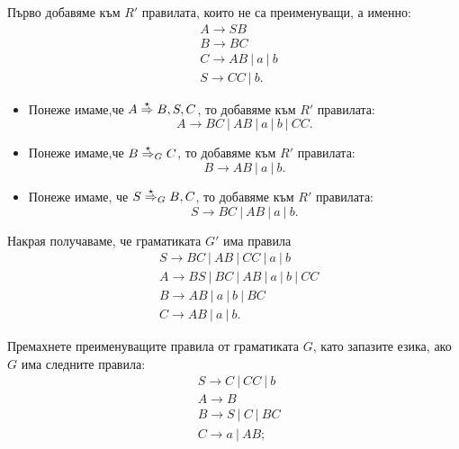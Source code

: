 \begin{extra}
\begin{multicols}{2}
\begin{example}
      Първо добавяме към $R'$ правилата, които не са преименуващи, а именно:
      \begin{align*}
        & A \to SB\\
        & B \to BC\\
        & C \to AB\ |\ a\ |\ b\\
        & S \to CC\ |\ b.
      \end{align*}
      \begin{itemize}
      \item 
        Понеже имаме,че $A \stackrel{{\star}}{\Rightarrow} B,S,C$, то добавяме към $R'$ правилата:
        \[A \to BC\ |\ AB\ |\ a\ |\ b\ |\ CC.\]
      \item
        Понеже имаме,че $B \stackrel{{\star}}{\Rightarrow}_G C$, то добавяме към $R'$ правилата:
        \[B \to AB\ |\ a\ |\ b.\]
      \item
        Понеже имаме, че $S \stackrel{{\star}}{\Rightarrow}_G B,C$, то добавяме към $R'$ правилата:
        \[S \to BC\ |\ AB\ |\ a\ |\ b.\]
      \end{itemize}
      Накрая получаваме, че граматиката $G'$ има правила
      \begin{align*}
        & S \to BC\ |\ AB\ |\ CC\ |\ a\ |\ b\\
        & A \to BS\ |\ BC\ |\ AB\ |\ a\ |\ b\ |\ CC\\
        & B \to AB\ |\ a\ |\ b\ |\ BC\\
        & C \to AB\ |\ a\ |\ b.
      \end{align*}
    \end{example}
  \end{multicols}
\end{extra}

\begin{extra}
\begin{problem}
  Премахнете преименуващите правила от граматиката $G$, като запазите езика, ако $G$ има следните правила:
    \begin{align*}
      & S \to C\ |\ CC\ |\ b\\
      & A \to B\\
      & B \to S\ |\ C\ |\ BC\\
      & C \to a\ |\ AB;
    \end{align*}
\end{problem}
\end{extra}

